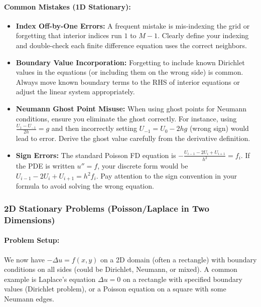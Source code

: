 \documentclass[a4paper,11pt]{article}
\begin{document}
\paragraph{Common Mistakes (1D Stationary):}
\begin{itemize}
    \item \textbf{Index Off-by-One Errors:} A frequent mistake is mis-indexing the grid or forgetting that interior indices run $1$ to $M-1$. Clearly define your indexing and double-check each finite difference equation uses the correct neighbors.
    \item \textbf{Boundary Value Incorporation:} Forgetting to include known Dirichlet values in the equations (or including them on the wrong side) is common. Always move known boundary terms to the RHS of interior equations or adjust the linear system appropriately.
    \item \textbf{Neumann Ghost Point Misuse:} When using ghost points for Neumann conditions, ensure you eliminate the ghost correctly. For instance, using $\frac{U_1 - U_{-1}}{2h}=g$ and then incorrectly setting $U_{-1}=U_0 - 2hg$ (wrong sign) would lead to error. Derive the ghost value carefully from the derivative definition.
    \item \textbf{Sign Errors:} The standard Poisson FD equation is $- \frac{U_{i-1}-2U_i+U_{i+1}}{h^2} = f_i$. If the PDE is written $u''=f$, your discrete form would be $U_{i-1}-2U_i+U_{i+1} = h^2 f_i$. Pay attention to the sign convention in your formula to avoid solving the wrong equation.
\end{itemize}

\subsubsection{2D Stationary Problems (Poisson/Laplace in Two Dimensions)}
\paragraph{Problem Setup:}
We now have $-\Delta u = f(x,y)$ on a 2D domain (often a rectangle) with boundary conditions on all sides (could be Dirichlet, Neumann, or mixed). A common example is Laplace’s equation $\Delta u = 0$ on a rectangle with specified boundary values (Dirichlet problem), or a Poisson equation on a square with some Neumann edges.
\end{document}
